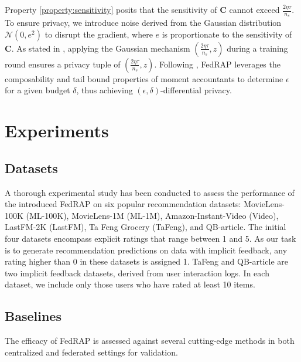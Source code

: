 \documentclass{article} %
\begin{document}
Property \ref{property:sensitivity} posits that the sensitivity of $\mathbf{C}$ cannot exceed $\frac{2\eta\tau}{n_s}$. To ensure privacy, we introduce noise derived from the Gaussian distribution $\mathcal{N}(0, e^2)$ to disrupt the gradient, where $e$ is proportionate to the sensitivity of $\mathbf{C}$. As stated in  \citet{mcmahan2018general}, applying the Gaussian mechanism $(\frac{2\eta\tau}{n_s}, z)$ during a training round ensures a privacy tuple of $(\frac{2\eta\tau}{n_s}, z)$.
Following \citet{abadi2016deep}, FedRAP leverages the composability and tail bound properties of moment accountants to determine $\epsilon$ for a given budget $\delta$, thus achieving $(\epsilon, \delta)$-differential privacy.


\section{Experiments}
\label{sec:experiments}

\subsection{Datasets}

A thorough experimental study has been conducted to assess the performance of the introduced FedRAP on six popular recommendation datasets: MovieLens-100K (ML-100K)\footnotemark[1], MovieLens-1M (ML-1M)\footnotemark[1], Amazon-Instant-Video (Video)\footnotemark[2], LastFM-2K (LastFM)\footnotemark[3] \citep{Cantador:RecSys2011}, Ta Feng Grocery (TaFeng)\footnotemark[4], and QB-article\footnotemark[5] \citep{Tenrec}. 
The initial four datasets encompass explicit ratings that range between 1 and 5. As our task is to generate recommendation predictions on data with implicit feedback, any rating higher than 0 in these datasets is assigned 1. 
TaFeng and QB-article are two implicit feedback datasets, derived from user interaction logs. 
In each dataset, we include only those users who have rated at least 10 items.


\subsection{Baselines}
The efficacy of FedRAP is assessed against several cutting-edge methods in both centralized and federated settings for validation.
\end{document}
